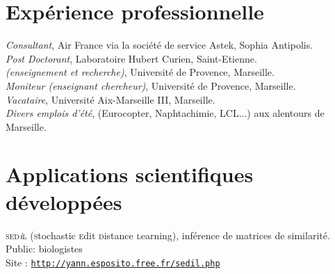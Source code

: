 


\reversemarginpar



\afficheContactInfos

\section*{Expérience professionnelle}

\noindent{}\emph{Consultant}, Air France via la société de service Astek, Sophia Antipolis.\\
\emph{Post Doctorant}, Laboratoire Hubert Curien, Saint-Etienne.\\
\emph{ {\footnotesize (enseignement et recherche)}}, Université de Provence, Marseille.\\
\emph{Moniteur (enseignant \amper{} chercheur)}, Université de Provence, Marseille.\\
\emph{Vacataire}, Université Aix-Marseille III, Marseille.\\
\emph{Divers emplois d'été}, {\footnotesize (Eurocopter, Naphtachimie, LCL...) } aux alentours de Marseille.\\

\section*{Applications scientifiques développées}
\textsc{sed}\textit{\footnotesize i}\textsc{l} ({\textsc{\color{darkred}s}tochastic 
\textsc{\color{darkred}e}dit
\textsc{\color{darkred}d}{\color{darkred}i}stance
\textsc{\color{darkred}l}earning}), 
inférence de matrices de similarité.\\
{\footnotesize \phantom{espace}Public: biologistes}\\
{\footnotesize \phantom{espace}Site : \href{http://yann.esposito.free.fr/sedil.php}{\texttt{http\string://yann.esposito.free.fr/sedil.php}}}

